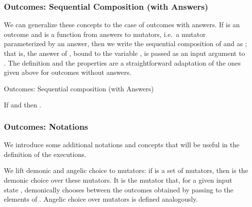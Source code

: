 \documentclass{CSML}
\theoremstyle{definition}\newtheorem{notation}[thm]{Notation}
\theoremstyle{plain}\newtheorem{satz}[thm]{Satz}
\begin{document}
\begin{lem}

\end{lem}

\subsubsection{Outcomes: Sequential Composition (with Answers)}

We can generalize these concepts to the case of outcomes with answers.
If  is an outcome and  is a function from answers to mutators, i.e.~a mutator parameterized by an answer, then
we write the sequential composition of  and  as ; that is,
the answer of , bound to the variable , is passed as an input argument to .
The definition and the properties are a straightforward adaptation of the ones given above for outcomes without answers.

\begin{defi}{Outcomes: Sequential composition (with Answers)}






\end{defi}

\begin{lem}

\end{lem}

\begin{lem}
If  and  then .
\end{lem}

\begin{lem}

\end{lem}

\subsubsection{Outcomes: Notations}

We introduce some additional notations and concepts that will 
be useful in the definition of the executions.

We lift demonic and angelic choice to mutators: if  is a set of mutators,
then  is the demonic choice over these mutators. It is the
mutator that, for a given input state , demonically chooses between the outcomes obtained by
passing  to the elements of . Angelic choice over mutators is defined analogously.
\end{document}
